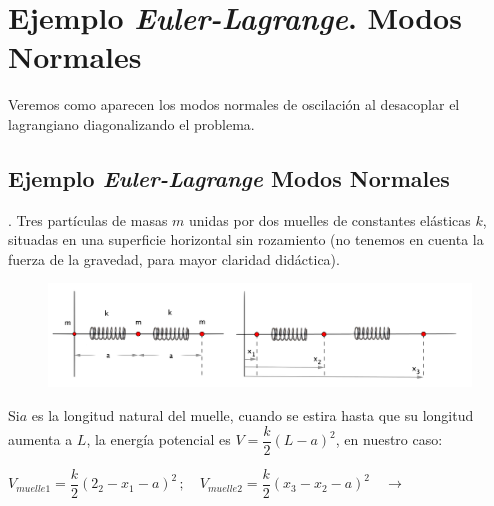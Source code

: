 \chapter{Ejemplo \emph{Euler-Lagrange}. Modos Normales}


\vspace{10mm}
\begin{adjustwidth}{50pt}{50pt}
\begin{ejemplo}
	Veremos como aparecen los modos normales de oscilación al desacoplar el lagrangiano diagonalizando el problema.
\end{ejemplo}
\end{adjustwidth}


\section{Ejemplo \emph{Euler-Lagrange} Modos Normales}

\vspace{5mm}
\begin{example}
.	Tres partículas de masas $m$	 unidas por dos muelles de constantes elásticas $k$, situadas en una superficie horizontal sin rozamiento (no tenemos en cuenta la fuerza de la gravedad, para mayor claridad didáctica).

	\begin{figure}[H]
		\centering
		\includegraphics[width=1\textwidth]{imagenes/img06-01.png}
	\end{figure}
\end{example}
\vspace{5mm}

Si$a$ es la longitud natural del muelle, cuando se estira hasta que su longitud aumenta a $L$, la energía potencial es $V=\dfrac k 2 (L-a)^2$, en nuestro caso: 

$V_{muelle 1}=\dfrac k 2 (2_2-x_1-a)^2\, ; \quad 
V_{muelle 2}=\dfrac k 2 (x_3-x_2-a)^2 \quad \to $ 

